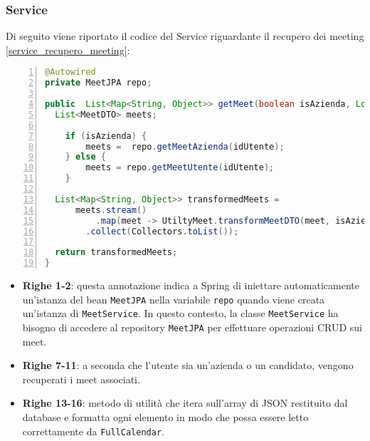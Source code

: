 \subsubsection{Service}
Di seguito viene riportato il codice del Service riguardante il recupero dei meeting \ref{service_recupero_meeting}: 
\begin{lstlisting}[language=java, frame=lines, basicstyle=\ttfamily\scriptsize, numbers=left, 
  label={service_recupero_meeting}, caption={service recupero meeting}]
@Autowired
private MeetJPA repo;

public  List<Map<String, Object>> getMeet(boolean isAzienda, Long idUtente) {
  List<MeetDTO> meets;

	if (isAzienda) {
		meets =  repo.getMeetAzienda(idUtente);
	} else {
		meets = repo.getMeetUtente(idUtente);
	}

  List<Map<String, Object>> transformedMeets = 
      meets.stream()
		  .map(meet -> UtiltyMeet.transformMeetDTO(meet, isAzienda))
        .collect(Collectors.toList());

  return transformedMeets;
}
\end{lstlisting}
\begin{itemize}
    \item \textbf{Righe 1-2}: questa annotazione indica a Spring di iniettare automaticamente un'istanza del bean \texttt{MeetJPA}
    nella variabile \texttt{repo} quando viene creata un'istanza di \texttt{MeetService}. \cite{AutoWiredSpring}
    In questo contesto, la classe \texttt{MeetService} ha bisogno di accedere al repository \texttt{MeetJPA} per effettuare
    operazioni CRUD sui meet.

    \item \textbf{Righe 7-11}: a seconda che l'utente sia un'azienda o un candidato, vengono recuperati i meet associati.
    
    \item \textbf{Righe 13-16}: metodo di utilità che itera sull'array di JSON restituito dal
    database e formatta ogni elemento in modo che possa essere letto correttamente da \texttt{FullCalendar}.
\end{itemize}